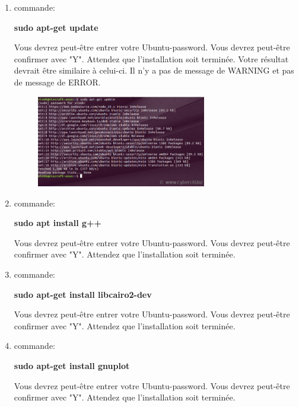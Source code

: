 \documentclass{article}
\begin{document}
\begin{enumerate}
\item commande:
\begin{tcolorbox}[width=\textwidth,colframe=BurntOrange,colback={black},title={ubuntu terminal},outer arc=0mm,colupper=white]  
    \large\textbf{  sudo apt-get update }
\end{tcolorbox}
Vous devrez peut-être entrer votre Ubuntu-password. Vous devrez peut-être confirmer avec "Y". Attendez que l'installation soit terminée. 
Votre résultat devrait être similaire à celui-ci. Il n'y a pas de message de WARNING et pas de message de ERROR.
\begin{figure}[H]
\center
\includegraphics[width=0.7\textwidth]{Plots/What-does-sudo-apt-get-update-command-do-on-Ubuntu-Debian-Linux.png}
\end{figure}
\item commande:
\begin{tcolorbox}[width=\textwidth,colframe=BurntOrange,colback={black},title={ubuntu terminal},outer arc=0mm,colupper=white]  
    \large\textbf{  sudo apt install g++ }
\end{tcolorbox}
Vous devrez peut-être entrer votre Ubuntu-password. Vous devrez peut-être confirmer avec "Y". Attendez que l'installation soit terminée. 
\item commande:
\begin{tcolorbox}[width=\textwidth,colframe=BurntOrange,colback={black},title={ubuntu terminal},outer arc=0mm,colupper=white]  
   \large\textbf{  sudo apt-get install libcairo2-dev }
\end{tcolorbox}
Vous devrez peut-être entrer votre Ubuntu-password. Vous devrez peut-être confirmer avec "Y". Attendez que l'installation soit terminée. 
\item commande:
\begin{tcolorbox}[width=\textwidth,colframe=BurntOrange,colback={black},title={ubuntu terminal},outer arc=0mm,colupper=white]  
    \large\textbf{  sudo apt-get install gnuplot }
\end{tcolorbox}
Vous devrez peut-être entrer votre Ubuntu-password. Vous devrez peut-être confirmer avec "Y". Attendez que l'installation soit terminée. 
\end{enumerate}
\end{document}
